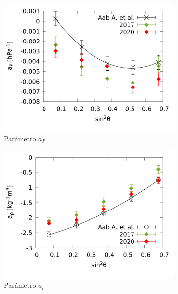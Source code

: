 				\begin{figure}[H]
					\begin{subfigure}[b]{0.5\textwidth}
					\includegraphics[width=\linewidth]{params/ap_2017_2020_above_1EeV.png}
					\caption{Parámetro $a_P$ }
					\end{subfigure}%
					\hspace{\fill}
					\begin{subfigure}[b]{0.5\textwidth}
					\includegraphics[width=\linewidth]{params/arho_2017_2020_above_1EeV.png}
					\caption{Parámetro $a_{\rho}$ }
					\end{subfigure}%
					\hspace{\fill}
					\begin{subfigure}[b]{\textwidth}

\end{subfigure}
\end{figure}
